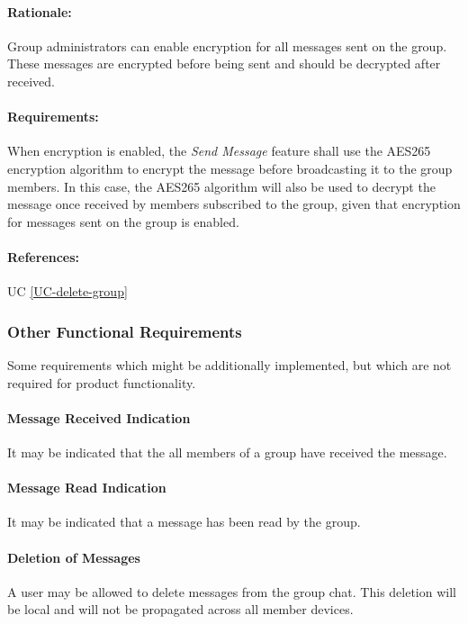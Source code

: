 \documentclass[11pt]{article}
\begin{document}
\paragraph{Rationale:} Group administrators can enable encryption for all messages sent on the group. These messages are encrypted before being sent and should be decrypted after received.
\paragraph{Requirements:} When encryption is enabled, the \textit{Send Message} feature shall use the AES265 encryption algorithm to encrypt the message before broadcasting it to the group members. In this case, the AES265 algorithm will also be used to decrypt the message once received by members subscribed to the group, given that encryption for messages sent on the group is enabled.
\paragraph{References:} UC \ref{UC-delete-group}

\subsubsection{Other Functional Requirements}	\label{FR-nice-to-have}
Some requirements which might be additionally implemented, but which are not required for product functionality.
\paragraph{Message Received Indication} It may be indicated that the all members of a group have received the message.
\paragraph{Message Read Indication} It may be indicated that a message has been read by the group.
\paragraph{Deletion of Messages} A user may be allowed to delete messages from the group chat. This deletion will be local  and will not be propagated across all member devices.
\end{document}
